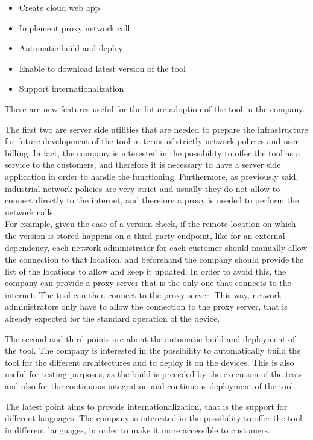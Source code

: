 \begin{itemize}
  \item Create cloud web app
  \item Implement proxy network call
  \item Automatic build and deploy
  \item Enable to download latest version of the tool
  \item Support internationalization
\end{itemize}

These are new features useful for the future adoption of the tool in the company.

The first two are server side utilities that are needed to prepare the infrastructure for future development of the tool in terms of strictly network policies and user billing. In fact, the company is interested in the possibility to offer the tool as a service to the customers, and therefore it is necessary to have a server side application in order to handle the functioning. Furthermore, as previously said, industrial network policies are very strict and usually they do not allow to connect directly to the internet, and therefore a proxy is needed to perform the network calls. \\
For example, given the case of a version check, if the remote location on which the version is stored happens on a third-party endpoint, like for an external dependency, each network administrator for each customer should manually allow the connection to that location, and beforehand the company should provide the list of the locations to allow and keep it updated. In order to avoid this, the company can provide a proxy server that is the only one that connects to the internet. The tool can then connect to the proxy server. This way, network administrators only have to allow the connection to the proxy server, that is already expected for the standard operation of the device.

The second and third points are about the automatic build and deployment of the tool. The company is interested in the possibility to automatically build the tool for the different architectures and to deploy it on the devices. This is also useful for testing purposes, as the build is preceded by the execution of the tests and also for the continuous integration and continuous deployment of the tool.

The latest point aims to provide internationalization, that is the support for different languages. The company is interested in the possibility to offer the tool in different languages, in order to make it more accessible to customers.

